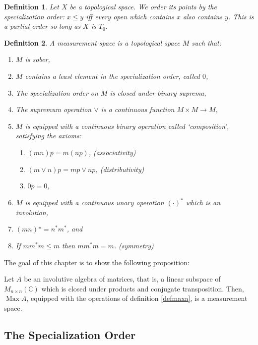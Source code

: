 \documentclass{article}
\theoremstyle{plain}
\newtheorem{definition}{Definition}
\theoremstyle{nonumberplain}
\DeclareMathOperator{\Max}{Max}
\newcommand{\C}{\mathbb{C}}
\begin{document}
\begin{definition}
Let $X$ be a topological space. We order its points by the specialization order: $x \leq y$ iff every open which contains $x$ also contains $y$. This is a partial order so long as $X$ is $T_0$.
\end{definition}

\begin{definition}
A measurement space is a topological space $M$ such that:
\begin{enumerate}[label=\roman*)]
\item \label{msober} $M$ is sober,
\item \label{leastelem} $M$ contains a least element in the specialization order, called $0$,
\item \label{binsup} The specialization order on $M$ is closed under binary suprema,
\item \label{contsup} The supremum operation $\lor$ is a continuous function $M \times M \to M$,
\item \label{binop} $M$ is equipped with a continuous binary operation called `composition', satisfying the axioms:
\begin{enumerate}
\item \label{assoc} $(mn)p = m(np)$, \quad \textit{(associativity)}
\item \label{dist} $(m \lor n)p = mp \lor np$, \quad \textit{(distributivity)}
\item \label{absorp} $0p = 0$,
\end{enumerate}
\item \label{inv1} $M$ is equipped with a continuous unary operation $(\cdot)^*$ which is an involution,
\item \label{inv2} $(mn)* = n^* m^*$, and
\item \label{symmetry} If $m m^* m \leq m$ then $m m^* m = m$. \quad \textit{(symmetry)}
\end{enumerate}
\end{definition}

The goal of this chapter is to show the following proposition:

\begin{prop*}
Let $A$ be an involutive algebra of matrices, that is, a linear subspace of $M_{n \times n}(\C)$ which is closed under products and conjugate transposition. Then, $\Max A$, equipped with the operations of definition \ref{defmaxa}, is a measurement space.
\end{prop*}

\subsection{The Specialization Order}
\end{document}
